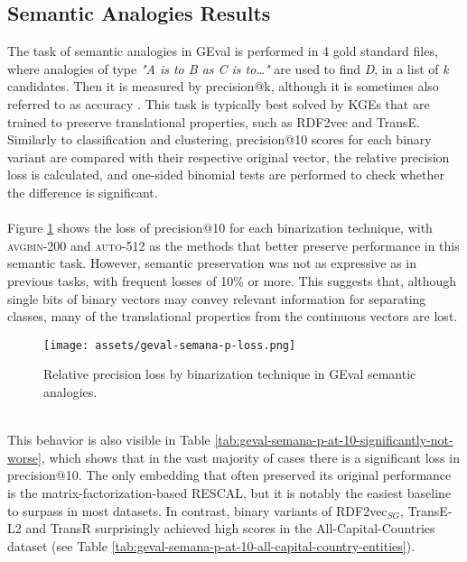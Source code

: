\documentclass[11pt,titlepage,oneside,openany]{book}
\begin{document}
\subsection{Semantic Analogies Results}
\label{subsec:geval-sem-ana}

The task of semantic analogies in GEval is performed in 4 gold standard files, where analogies of type \textit{"A is to B as C is to…"} are used to find \textit{D}, in a list of \textit{k} candidates. Then it is measured by precision@k, although it is sometimes also referred to as accuracy \cite{pellegrino_geval_2020, pellegrino_configurable_2019, portisch_rdf2vec_2023}. This task is typically best solved by KGEs that are trained to preserve translational properties, such as RDF2vec and TransE. Similarly to classification and clustering, precision@10 scores for each binary variant are compared with their respective original vector, the relative precision loss is calculated, and one-sided binomial tests are performed to check whether the difference is significant.\\
\\
Figure \ref{fig:geval-semana-p-loss} shows the loss of precision@10 for each binarization technique, with \textsc{avgbin-200} and \textsc{auto-512} as the methods that better preserve performance in this semantic task. However, semantic preservation was not as expressive as in previous tasks, with frequent losses of 10\% or more. This suggests that, although single bits of binary vectors may convey relevant information for separating classes, many of the translational properties from the continuous vectors are lost.\\
\begin{figure}[h!]
    \centering
    \centerline{\texttt{[image: assets/geval-semana-p-loss.png]}}
    \vspace*{-3mm}
    \caption{Relative precision loss by binarization technique in GEval semantic analogies.}
    \label{fig:geval-semana-p-loss}
\end{figure}
\\
This behavior is also visible in Table \ref{tab:geval-semana-p-at-10-significantly-not-worse}, which shows that in the vast majority of cases there is a significant loss in precision@10. The only embedding that often preserved its original performance is the matrix-factorization-based RESCAL, but it is notably the easiest baseline to surpass in most datasets. In contrast, binary variants of RDF2vec$_{SG}$, TransE-L2 and TransR surprisingly achieved high scores in the All-Capital-Countries dataset (see Table \ref{tab:geval-semana-p-at-10-all-capital-country-entities}). \\
\end{document}

